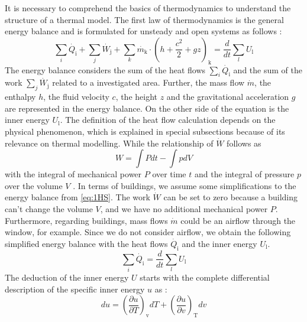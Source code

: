     It is necessary to comprehend the basics of thermodynamics to understand the structure of a thermal model. The first law of thermodynamics is the general energy balance and is formulated for unsteady and open systems as follows \cite{Baehr.2016b}:
    \begin{equation}
        \label{eq:1HS}
        \sum_i \dot{Q_\text{i}} + \sum_j \dot{W_\text{j}} + \sum_k \dot{m_\text{k}}\cdot (h + \frac{c^2}{2} + gz)_\text{k} = \frac{d}{dt} \sum_l U_\text{l}
    \end{equation}
    The energy balance considers the sum of the heat flows $\sum_i \dot{Q_\text{i}}$ and the sum of the work $\sum_j \dot{W_\text{j}}$ related to a investigated area. Further, the mass flow $\dot{m}$, the enthalpy $h$, the fluid velocity $c$, the height $z$ and the gravitational acceleration $g$ are represented in the energy balance. On the other side of the equation is the inner energy $U_\text{l}$. \newline
    The definition of the heat flow calculation depends on the physical phenomenon, which is explained in special subsections because of its relevance on thermal modelling. While the relationship of $\dot{W}$ follows as  
    \begin{equation}
        \label{eq:workinEnergyBalance}
        W =\int Pdt - \int pdV
    \end{equation}
    with the integral of mechanical power $P$ over time $t$ and the integral of pressure $p$ over the volume $V$ \cite{Baehr.2016b}.\newline
    In terms of buildings, we assume some simplifications to the energy balance from \autoref{eq:1HS}.
    The work $\dot{W}$ can be set to zero because a building can't change the volume $V$, and we have no additional mechanical power $P$. Furthermore, regarding buildings, mass flows $\dot{m}$ could be an airflow through the window, for example. Since we do not consider airflow, we obtain the following simplified energy balance with the heat flows $\dot{Q_\text{i}}$ and the inner energy $U_\text{l}$.
     \begin{equation}
        \label{eq:1HSkurz}
        \sum_i \dot{Q_\text{i}}  = \frac{d}{dt} \sum_l U_\text{l}
    \end{equation}
    The deduction of the inner energy $U$  starts with the complete differential description of the specific inner energy $u$ as \cite{Cerbe.2021}:
    \begin {equation} 
    \label{eq:spezificinnerEnergy}
    du = (\frac{\partial u}{\partial T})_\text{v} dT + (\frac{\partial u}{\partial v})_\text{T} dv
    \end{equation}
